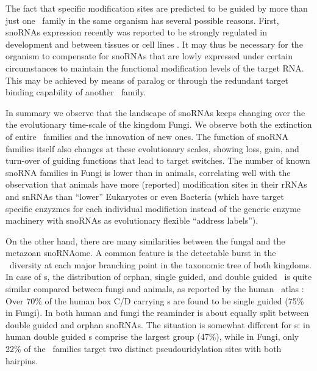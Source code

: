 The fact that specific modification sites are predicted to be guided by
more than just one \sno\ family in the same organism has several possible
reasons. First, snoRNAs expression recently was reported to be strongly
regulated in development and between tissues or cell lines \cite{****}. It
may thus be necessary for the organism to compensate for snoRNAs that are
lowly expressed under certain circumstances to maintain the functional
modification levels of the target RNA. This may be achieved by means of
paralog or through the redundant target binding capability of another \sno\
family.

In summary we observe that the landscape of snoRNAs keeps changing over the
the evolutionary time-scale of the kingdom Fungi. We observe both the
extinction of entire \sno\ families and the innovation of new ones. The
function of snoRNA families itself also changes at these evolutionary
scales, showing loss, gain, and turn-over of guiding functions that lead to
target switches. The number of known snoRNA families in Fungi is lower than
in animals, correlating well with the observation that animals have more
(reported) modification sites in their rRNAs and snRNAs than ``lower''
Eukaryotes \TODO{reference} or even Bacteria (which have target specific
enzyzmes for each individual modifiction instead of the generic enzyme
machinery with snoRNAs as evolutionary flexible ``address labels'').

On the other hand, there are many similarities between the fungal and the
metazoan snoRNAome.  A common feature is the detectable burst in the \sno\
diversity at each major branching point in the taxonomic tree of both
kingdoms.  In case of \cd s, the distribution of orphan, single guided, and
double guided \snos\ is quite similar compared between fungi and animals,
as reported by the human \sno\ atlas \citep{Jorjani:2016}: Over 70\% of the
human box C/D carrying \sno s are found to be single guided (75\% in
Fungi).  In both human and fungi the reaminder is about equally split
between double guided and orphan snoRNAs. The situation is somewhat
different for \haca s: in human double guided \sno s comprise the largest
group (47\%), while in Fungi, only 22\% of the \haca\ families target two
distinct pseudouridylation sites with both hairpins.

